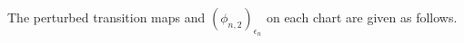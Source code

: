 \documentclass[10pt,a4paper,reqno]{amsart}
\theoremstyle{definition}
\numberwithin{equation}{section}
\numberwithin{figure}{section}
\newcommand{\C}{\mathbb{C}}
\newcommand{\ep}{\epsilon}
\newcommand{\arrowr}{\rightarrow}
\begin{document}
The perturbed transition maps and $(\phi_{n,2})_{\ep_n}$ on each chart are given as follows.
%
%
%
\end{document}
